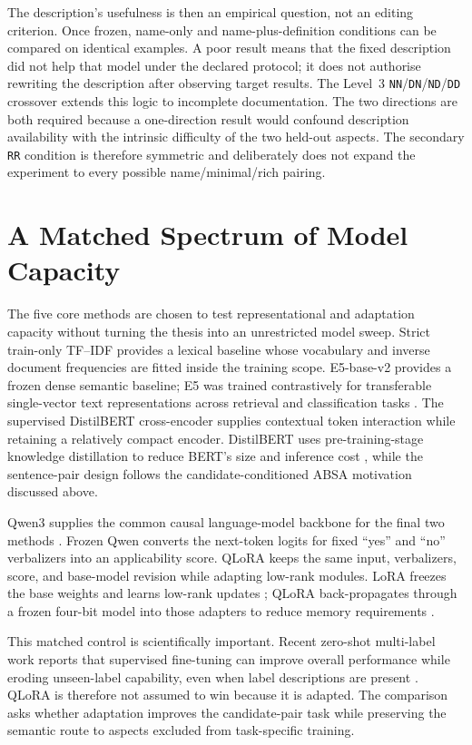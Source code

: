 The description's usefulness is then an empirical question, not an editing
criterion. Once frozen, name-only and name-plus-definition conditions can be
compared on identical examples. A poor result means that the fixed description
did not help that model under the declared protocol; it does not authorise
rewriting the description after observing target results. The Level~3
\texttt{NN}/\texttt{DN}/\texttt{ND}/\texttt{DD} crossover extends this logic
to incomplete documentation. The two directions are both required because a
one-direction result would confound description availability with the intrinsic
difficulty of the two held-out aspects. The secondary \texttt{RR} condition is
therefore symmetric and deliberately does not expand the experiment to every
possible name/minimal/rich pairing.

\section{A Matched Spectrum of Model Capacity}

The five core methods are chosen to test representational and adaptation
capacity without turning the thesis into an unrestricted model sweep. Strict
train-only TF--IDF provides a lexical baseline whose vocabulary and inverse
document frequencies are fitted inside the training scope. E5-base-v2 provides
a frozen dense semantic baseline; E5 was trained contrastively for transferable
single-vector text representations across retrieval and classification tasks
\cite{wang2022e5}. The supervised DistilBERT cross-encoder supplies contextual
token interaction while retaining a relatively compact encoder. DistilBERT
uses pre-training-stage knowledge distillation to reduce BERT's size and
inference cost \cite{sanh2019distilbert}, while the sentence-pair design follows
the candidate-conditioned ABSA motivation discussed above.

Qwen3 supplies the common causal language-model backbone for the final two
methods \cite{yang2025qwen3}. Frozen Qwen converts the next-token logits for
fixed ``yes'' and ``no'' verbalizers into an applicability score. QLoRA keeps
the same input, verbalizers, score, and base-model revision while adapting
low-rank modules. LoRA freezes the base weights and learns low-rank updates
\cite{hu2022lora}; QLoRA back-propagates through a frozen four-bit model into
those adapters to reduce memory requirements \cite{dettmers2023qlora}.

This matched control is scientifically important. Recent zero-shot multi-label
work reports that supervised fine-tuning can improve overall performance while
eroding unseen-label capability, even when label descriptions are present
\cite{chen2025preserving}. QLoRA is therefore not assumed to win because it is
adapted. The comparison asks whether adaptation improves the candidate-pair
task while preserving the semantic route to aspects excluded from
task-specific training.

